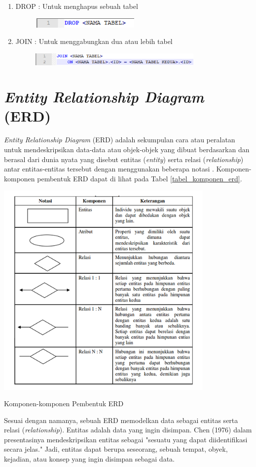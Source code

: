 \begin{enumerate}
\begin{figure}[H]
		\end{figure} 
		\item
		DROP : Untuk menghapus sebuah tabel
		\begin{figure}[H]
			\includegraphics[width=0.5\textwidth]{gambar/sql/drop}
		\end{figure}
		\item
		JOIN : Untuk menggabungkan dua atau lebih tabel
		\begin{figure}[H]
			\includegraphics[width=0.8\textwidth]{gambar/sql/join}
		\end{figure}
	\end{enumerate}
		
\section{\emph{Entity Relationship Diagram} (ERD)}
	\emph{Entity Relationship Diagram} (ERD) adalah sekumpulan cara atau peralatan untuk mendeskripsikan data-data atau objek-objek yang dibuat berdasarkan dan berasal dari dunia nyata yang disebut entitas (\emph{entity}) serta relasi (\emph{relationship}) antar entitas-entitas tersebut dengan menggunakan beberapa notasi \cite{edi}. Komponen-komponen pembentuk ERD dapat di lihat pada Tabel \ref{tabel_komponen_erd}. 
	\begin{table}[H]
		\centering
		\includegraphics[width=0.8\textwidth]{gambar/erd/erd}
		\caption{Komponen-komponen Pembentuk ERD}
		\label{tabel_komponen_erd}
	\end{table}
	Sesuai dengan namanya, sebuah ERD memodelkan data sebagai entitas serta relasi (\emph{relationship}). Entitas adalah data yang ingin disimpan. Chen (1976) dalam presentasinya mendeskripsikan entitas sebagai  "sesuatu yang dapat diidentifikasi secara jelas." Jadi, entitas dapat berupa seseorang, sebuah tempat, obyek, kejadian, atau konsep yang ingin disimpan sebagai data. 
	
